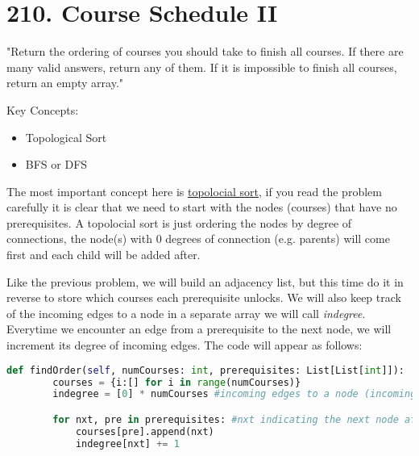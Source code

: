 \documentclass{article}
\begin{document}
\section*{210. Course Schedule II}
\begin{flushleft}
    "Return the ordering of courses you should take to finish all courses. If there are many valid answers, return any of them. If it is impossible to finish all courses, return an empty array."
\end{flushleft}
\begin{flushleft}
    Key Concepts:
    \begin{itemize}
        \item Topological Sort
        \item BFS or DFS
    \end{itemize}
\end{flushleft}
\begin{flushleft}
    The most important concept here is \underline{topolocial sort}, if you read the problem carefully it is clear that we need to start with the
    nodes (courses) that have no prerequisites. A topolocial sort is just ordering the nodes by degree of connections, the node(s) with 0 degrees
    of connection (e.g. parents) will come first and each child will be added after.
\end{flushleft}
\begin{flushleft}
    Like the previous problem, we will build an adjacency list, but this time do it in reverse to store which courses each prerequisite unlocks.
    We will also keep track of the incoming edges to a node in a separate array we will call \textit{indegree}. Everytime we encounter an edge from a prerequisite
    to the next node, we will increment its degree of incoming edges. The code will appear as follows:
    \begin{lstlisting}[language=python]
    def findOrder(self, numCourses: int, prerequisites: List[List[int]]):
        courses = {i:[] for i in range(numCourses)}
        indegree = [0] * numCourses #incoming edges to a node (incoming degree)

        for nxt, pre in prerequisites: #nxt indicating the next node after the prereq
            courses[pre].append(nxt)
            indegree[nxt] += 1
    \end{lstlisting}
\end{flushleft}
\end{document}
